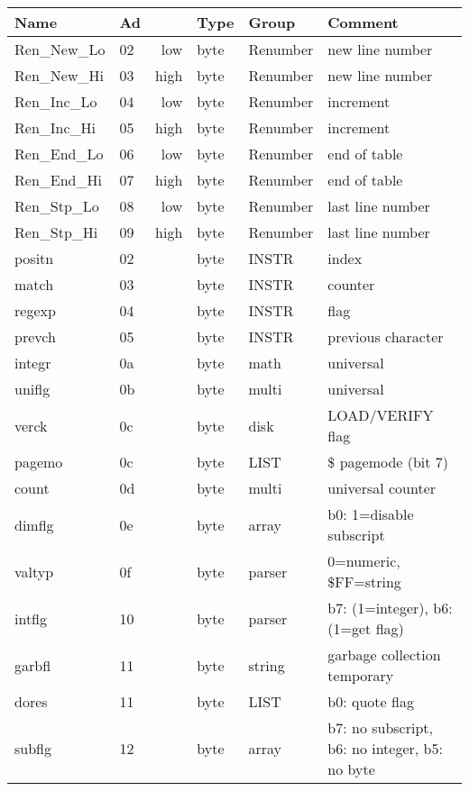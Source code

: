 \setlength{\tabcolsep}{1mm}
\begin{tabular}{|l|l|rl|l|l|}
\hline
Name & Ad & & Type & Group & Comment \\
\hline
Ren\_New\_Lo     &   02 & low  & byte  & Renumber  & new line number \\
Ren\_New\_Hi     &   03 & high & byte  & Renumber  & new line number \\
Ren\_Inc\_Lo     &   04 & low  & byte  & Renumber  & increment \\
Ren\_Inc\_Hi     &   05 & high & byte  & Renumber  & increment \\
Ren\_End\_Lo     &   06 & low  & byte  & Renumber  & end of table \\
Ren\_End\_Hi     &   07 & high & byte  & Renumber  & end of table \\
Ren\_Stp\_Lo     &   08 & low  & byte  & Renumber  & last line number \\
Ren\_Stp\_Hi     &   09 & high & byte  & Renumber  & last line number \\
positn           &   02 &  & byte  & INSTR  & index \\
match            &   03 &  & byte  & INSTR  & counter \\
regexp           &   04 &  & byte  & INSTR  & flag \\
prevch           &   05 &  & byte  & INSTR  & previous character \\
integr           &   0a &  & byte  & math   & universal \\
uniflg           &   0b &  & byte  & multi  & universal \\
verck            &   0c &  & byte  & disk   & LOAD/VERIFY flag \\
pagemo           &   0c &  & byte  & LIST   & \$ pagemode (bit 7) \\
count            &   0d &  & byte  & multi  & universal counter \\
dimflg           &   0e &  & byte  & array  & b0: 1=disable subscript \\
valtyp           &   0f &  & byte  & parser  & 0=numeric, \$FF=string \\
intflg           &   10 &  & byte  & parser  & b7: (1=integer), b6: (1=get flag) \\
garbfl           &   11 &  & byte  & string  & garbage collection temporary \\
dores            &   11 &  & byte  & LIST   & b0: quote flag \\
subflg           &   12 &  & byte  & array  & b7: no subscript, b6: no integer, b5: no byte \\

\end{tabular}
